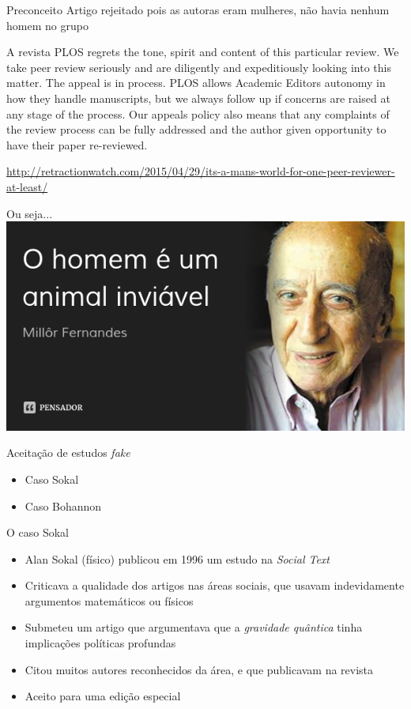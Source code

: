 \documentclass{beamer}
\begin{document}
\begin{frame}{Preconceito}
  Artigo rejeitado pois as autoras eram mulheres, não havia nenhum
  homem no grupo
    \begin{block}{A revista}
      \scriptsize
      PLOS regrets the tone, spirit and content of this particular
      review. We take peer review seriously and are diligently and
      expeditiously looking into this matter. The appeal is in
      process. PLOS allows Academic Editors autonomy in how they
      handle manuscripts, but we always follow up if concerns are
      raised at any stage of the process. Our appeals policy also
      means that any complaints of the review process can be fully
      addressed and the author given opportunity to have their paper
      re-reviewed.
    \end{block}

    \vfill
    \tiny
\url{http://retractionwatch.com/2015/04/29/its-a-mans-world-for-one-peer-reviewer-at-least/}
\end{frame}

\begin{frame}{Ou seja...}
  \includegraphics[width=\textwidth]{Etapas/millor}
\end{frame}

\begin{frame}{Aceitação de estudos {\em fake}}
  \begin{itemize}
  \item Caso Sokal
    \bigskip
  \item Caso Bohannon
  \end{itemize}
\end{frame}

\begin{frame}{O caso Sokal}
  \begin{itemize}
    \footnotesize
  \item Alan Sokal (físico) publicou em 1996 um estudo na {\em Social
      Text}
    \medskip
  \item Criticava a qualidade dos artigos nas áreas sociais, que
    usavam indevidamente argumentos matemáticos ou físicos
    \medskip
  \item Submeteu um artigo que argumentava que a {\em gravidade
      quântica} tinha implicações políticas profundas
    \medskip
  \item Citou muitos autores reconhecidos da área, e que publicavam na
    revista
    \medskip
  \item Aceito para uma edição especial
  \end{itemize}
\end{frame}
\end{document}
